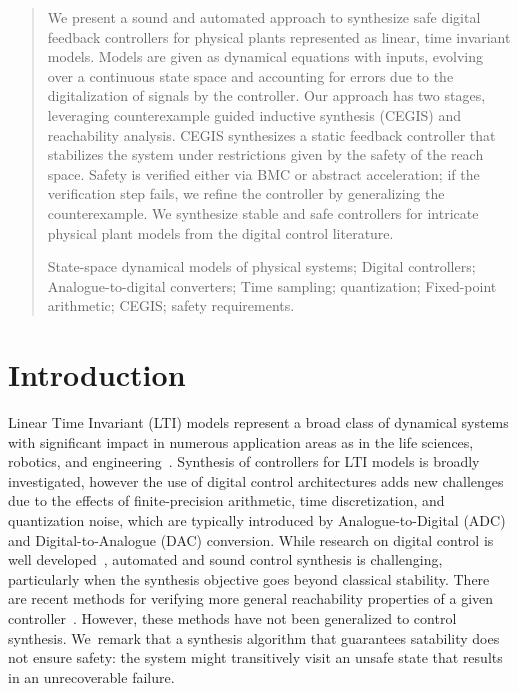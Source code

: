 \documentclass[runningheads,a4paper]{llncs}
\newcommand{\keywords}[1]{\par\addvspace\baselineskip
\noindent\keywordname\enspace\ignorespaces#1}
\begin{document}
\begin{abstract}
%
We present a sound and automated approach to synthesize safe digital
feedback controllers for physical plants represented as linear, time
invariant models.  Models are given as dynamical equations with inputs,
evolving over a continuous state space and accounting for errors due to the
digitalization of signals by the controller.  Our approach has two stages,
leveraging counterexample guided inductive synthesis (CEGIS) and
reachability analysis.  CEGIS synthesizes a static feedback controller that
stabilizes the system under restrictions given by the safety of the reach
space.  Safety is verified either via BMC or abstract acceleration; if the
verification step fails, we refine the controller by generalizing the
counterexample.  We synthesize stable and safe controllers for intricate
physical plant models from the digital control literature.
%
\keywords{
State-space dynamical models of physical systems; 
Digital controllers; 
Analogue-to-digital converters; 
Time sampling; 
quantization; 
Fixed-point arithmetic; 
CEGIS; 
safety requirements. 
}
\end{abstract}


\section{Introduction}

Linear Time Invariant (LTI) models represent a broad class of dynamical
systems with significant impact in numerous application areas as in the life
sciences, robotics, and engineering~\cite{astrom1997computer,Franklin15}. 
Synthesis of controllers for LTI models is broadly investigated, however the
use of digital control architectures adds new challenges due to the effects
of finite-precision arithmetic, time discretization, and quantization noise,
which are typically introduced by Analogue-to-Digital (ADC) and
Digital-to-Analogue (DAC) conversion.  While research on digital control is
well developed~\cite{astrom1997computer}, automated and sound control
synthesis is challenging, particularly when the synthesis objective goes
beyond classical stability.  There are recent methods for verifying more
general reachability properties of a given controller~\cite{FLD+11,Fre05}. 
However, these methods have not been generalized to control synthesis. 
We~remark that a synthesis algorithm that guarantees satability does not
ensure safety: the system might transitively visit an unsafe state that
results in an unrecoverable failure.
\end{document}
